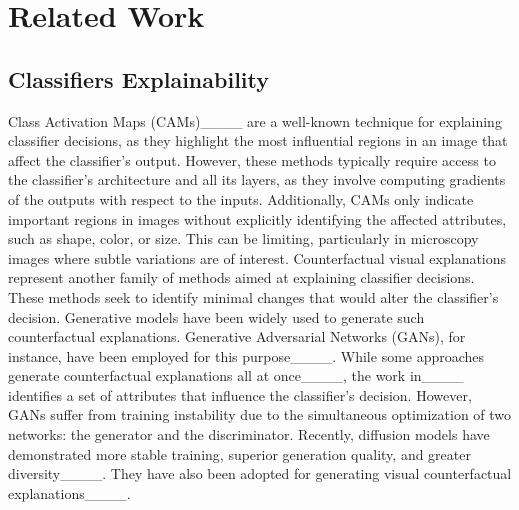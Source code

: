 \section{Related Work}
\subsection{Classifiers Explainability}
Class Activation Maps (CAMs)____ are a well-known technique for explaining classifier decisions, as they highlight the most influential regions in an image that affect the classifier's output. However, these methods typically require access to the classifier's architecture and all its layers, as they involve computing gradients of the outputs with respect to the inputs. Additionally, CAMs only indicate important regions in images without explicitly identifying the affected attributes, such as shape, color, or size. This can be limiting, particularly in microscopy images where subtle variations are of interest. Counterfactual visual explanations represent another family of methods aimed at explaining classifier decisions. These methods seek to identify minimal changes that would alter the classifier's decision. Generative models have been widely used to generate such counterfactual explanations. Generative Adversarial Networks (GANs), for instance, have been employed for this purpose____. While some approaches generate counterfactual explanations all at once____, the work in____ identifies a set of attributes that influence the classifier's decision. However, GANs suffer from training instability due to the simultaneous optimization of two networks: the generator and the discriminator. Recently, diffusion models have demonstrated more stable training, superior generation quality, and greater diversity____. They have also been adopted for generating visual counterfactual explanations____.


